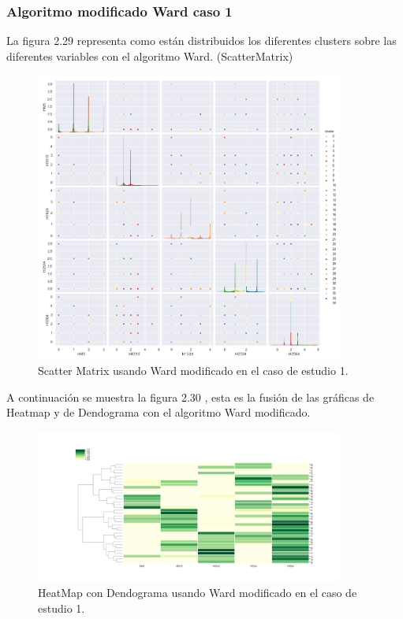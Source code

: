 	\subsubsection{Algoritmo modificado Ward caso 1}

	La figura 2.29 representa como están distribuidos los diferentes clusters sobre las diferentes variables con el 
	algoritmo Ward. (ScatterMatrix)\\

	\begin{figure}[htb]
		\centering
		\includegraphics[width=0.9\textwidth]{./imagenes/caso1/scatterMatrix_caso1_Ward_modificado}
		\caption{Scatter Matrix usando Ward modificado en el caso de estudio 1.} \label{fig:1}
	\end{figure}
	
	A continuación se muestra la figura 2.30 , esta es la fusión de las gráficas de 
	Heatmap y de Dendograma con el algoritmo Ward modificado.  \\

	\begin{figure}[htb]
		\centering
		\includegraphics[width=0.9\textwidth]{./imagenes/caso1/heatmapcondendograma_caso1_Ward_modificado}
		\caption{HeatMap con Dendograma usando Ward modificado en el caso de estudio 1.} \label{fig:1}
	\end{figure}

